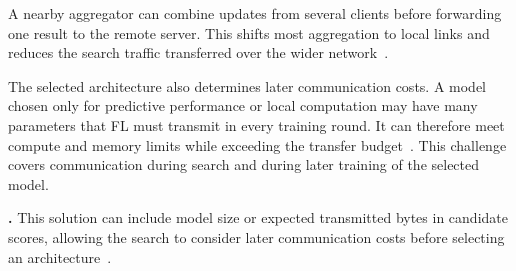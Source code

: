  A nearby aggregator can combine updates from several clients before forwarding one result to the remote server. This shifts most aggregation to local links and reduces the search traffic transferred over the wider network~\cite{finch_2024}.

The selected architecture also determines later communication costs. A model chosen only for predictive performance or local computation may have many parameters that FL must transmit in every training round. It can therefore meet compute and memory limits while exceeding the transfer budget~\cite{multi_objective_evo_fl_2020}. This challenge covers communication during search and during later training of the selected model.

\noindent\textbf{.} This solution can include model size or expected transmitted bytes in candidate scores, allowing the search to consider later communication costs before selecting an architecture~\cite{multi_objective_evo_fl_2020,fedregnas_2025}.
